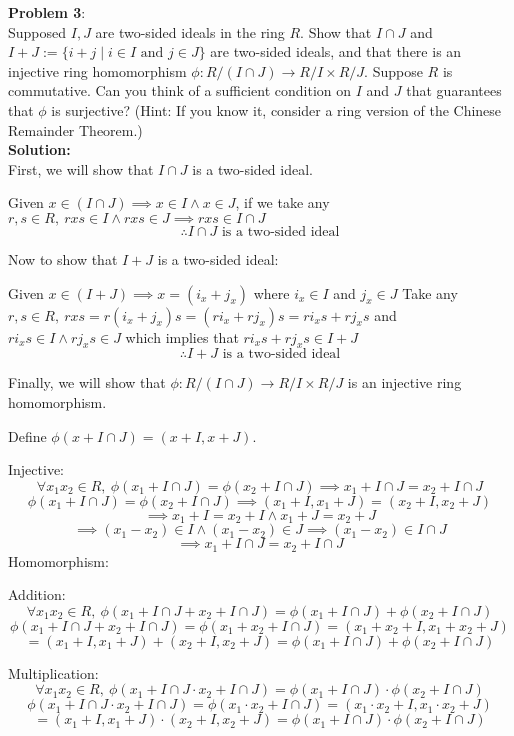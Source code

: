 \documentclass[11pt]{article}
\newcommand{\prob}[3]{\begin{flushleft}
        \textbf{Problem #1}: \\
        #2 
		\textbf{Solution:} 
		#3

\end{flushleft}}
\begin{document}
\prob{3}{
    Supposed $I,J$ are two-sided ideals in the ring $R$. Show that $I \cap J$ and $I + J := \{ i + j \mid i \in I \text{ and } j \in J \}$ are two-sided ideals, and that there is an injective ring homomorphism $\phi : R/(I \cap J) \rightarrow R/I \times R/J$. Suppose $R$ is commutative. Can you think of a sufficient condition on $I$ and $J$ that guarantees that $\phi$ is surjective? (Hint: If you know it, consider a ring version of the Chinese Remainder Theorem.)\\
}{\\
    First, we will show that $I \cap J$ is a two-sided ideal.

    Given $x \in (I \cap J) \implies x \in I \land x \in J$, if we take any $r, s \in R, \ rxs \in I \land rxs \in J \implies rxs \in I \cap J$
    $$\therefore I \cap J \text{ is a two-sided ideal}$$

    Now to show that $I + J$ is a two-sided ideal:

    Given $x \in (I + J) \implies x = (i_x + j_x)$ where $i_x \in I$ and $j_x \in J$
    Take any $r,s \in R, \ rxs = r(i_x + j_x)s = (ri_x + rj_x)s = ri_xs + rj_xs$ and $ri_xs \in I \land rj_xs \in J$ which implies that $ri_xs + rj_xs \in I + J$
    $$\therefore I + J \text{ is a two-sided ideal}$$

    Finally, we will show that $\phi : R/(I \cap J) \rightarrow R/I \times R/J$ is an injective ring homomorphism.

    Define $\phi(x + I \cap J) = (x + I, x + J)$.

    Injective:
    $$\forall x_1 x_2 \in R,\ \phi(x_1 + I \cap J) = \phi(x_2 + I \cap J) \implies x_1 + I \cap J = x_2 + I \cap J$$
    $$\phi(x_1 + I \cap J) = \phi(x_2 + I \cap J) \implies (x_1 + I, x_1 + J) = (x_2 + I, x_2 + J)$$
    $$ \implies x_1 + I = x_2 + I \land x_1 + J = x_2 + J$$
    $$\implies (x_1 - x_2) \in I \land (x_1 - x_2) \in J \implies (x_1 - x_2) \in I \cap J$$
    $$\implies x_1 + I \cap J = x_2 + I \cap J$$
    Homomorphism:

    Addition:
    $$\forall x_1 x_2 \in R,\ \phi(x_1 + I \cap J + x_2 + I \cap J) = \phi(x_1 + I \cap J) + \phi(x_2 + I \cap J)$$
    $$\phi(x_1 + I \cap J + x_2 + I \cap J) = \phi(x_1 + x_2 + I \cap J) = (x_1 + x_2 + I, x_1 + x_2 + J)$$
    $$ = (x_1 + I, x_1 + J) + (x_2 + I, x_2 + J) = \phi(x_1 + I \cap J) + \phi(x_2 + I \cap J)$$

    Multiplication:
    $$\forall x_1 x_2 \in R,\ \phi(x_1 + I \cap J \cdot x_2 + I \cap J) = \phi(x_1 + I \cap J) \cdot \phi(x_2 + I \cap J)$$
    $$\phi(x_1 + I \cap J \cdot x_2 + I \cap J) = \phi(x_1 \cdot x_2 + I \cap J) = (x_1 \cdot x_2 + I, x_1 \cdot x_2 + J)$$
    $$ = (x_1 + I, x_1 + J) \cdot (x_2 + I, x_2 + J) = \phi(x_1 + I \cap J) \cdot \phi(x_2 + I \cap J)$$

}
\end{document}
